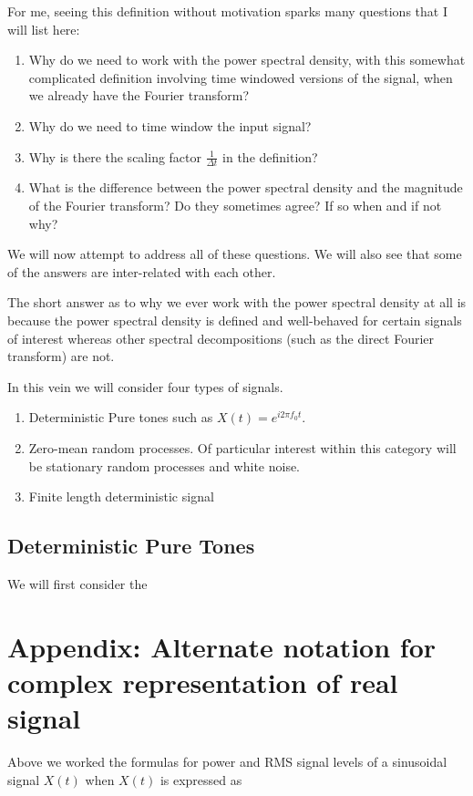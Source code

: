 \documentclass[12pt]{article}
\begin{document}
For me, seeing this definition without motivation sparks many questions that I will list here:

\begin{enumerate}
\item{Why do we need to work with the power spectral density, with this somewhat complicated definition involving time windowed versions of the signal, when we already have the Fourier transform?}
\item{Why do we need to time window the input signal?}
\item{Why is there the scaling factor $\frac{1}{\Delta t}$ in the definition?}
\item{What is the difference between the power spectral density and the magnitude of the Fourier transform? Do they sometimes agree? If so when and if not why?}
\end{enumerate}

We will now attempt to address all of these questions.
We will also see that some of the answers are inter-related with each other.

The short answer as to why we ever work with the power spectral density at all is because the power spectral density is defined and well-behaved for certain signals of interest whereas other spectral decompositions (such as the direct Fourier transform) are not.

In this vein we will consider four types of signals. 

\begin{enumerate}
\item Deterministic Pure tones such as $X(t) = e^{i2\pi f_0 t}$.
\item Zero-mean random processes. Of particular interest within this category will be stationary random processes and white noise.
\item Finite length deterministic signal
\end{enumerate}

\subsection{Deterministic Pure Tones}

We will first consider the 
\section{Appendix: Alternate notation for complex representation of real signal}

Above we worked the formulas for power and RMS signal levels of a sinusoidal signal $X(t)$ when $X(t)$ is expressed as
\end{document}
